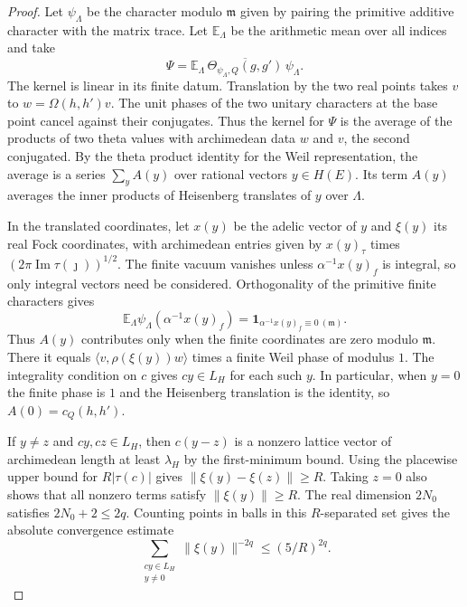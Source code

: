 \begin{proof}
Let $\psi_\Lambda$ be the character modulo $\mathfrak m$ given by pairing the primitive additive character with the matrix trace. Let $\mathbb E_\Lambda$ be the arithmetic mean over all indices and take
\[
 \Psi=\mathbb E_\Lambda\,
          \overline{\Theta_{\psi_\Lambda,Q}(g,g')}\,\psi_\Lambda .
\]
The kernel is linear in its finite datum. Translation by the two real points takes $v$ to $w=\Omega(h,h')v$. The unit phases of the two unitary characters at the base point cancel against their conjugates. Thus the kernel for $\Psi$ is the average of the products of two theta values with archimedean data $w$ and $v$, the second conjugated. By the theta product identity for the Weil representation, the average is a series $\sum_y A(y)$ over rational vectors $y\in H(E)$. Its term $A(y)$ averages the inner products of Heisenberg translates of $y$ over $\Lambda$.

In the translated coordinates, let $x(y)$ be the adelic vector of $y$ and $\xi(y)$ its real Fock coordinates, with archimedean entries given by $x(y)_\tau$ times $(2\pi\operatorname{Im}\tau(\jmath{}))^{1/2}$. The finite vacuum vanishes unless $\alpha^{-1}x(y)_f$ is integral, so only integral vectors need be considered. Orthogonality of the primitive finite characters gives
\[
 \mathbb E_\Lambda\psi_\Lambda(\alpha^{-1}x(y)_f)=
 \mathbf 1_{\alpha^{-1}x(y)_f\equiv0\ (\mathfrak m)} .
\]
Thus $A(y)$ contributes only when the finite coordinates are zero modulo $\mathfrak m$. There it equals $\langle v,\rho(\xi(y))w\rangle$ times a finite Weil phase of modulus $1$. The integrality condition on $c$ gives $cy\in L_H$ for each such $y$. In particular, when $y=0$ the finite phase is $1$ and the Heisenberg translation is the identity, so $A(0)=c_Q(h,h')$.

If $y\ne z$ and $cy,cz\in L_H$, then $c(y-z)$ is a nonzero lattice vector of archimedean length at least $\lambda_H$ by the first-minimum bound. Using the placewise upper bound for $R|\tau(c)|$ gives $\|\xi(y)-\xi(z)\|\ge R$. Taking $z=0$ also shows that all nonzero terms satisfy $\|\xi(y)\|\ge R$. The real dimension $2N_0$ satisfies $2N_0+2\le 2q$. Counting points in balls in this $R$-separated set gives the absolute convergence estimate
\[
 \sum_{\substack{cy\in L_H\\y\ne0}}
       \|\xi(y)\|^{-2q}\le (5/R)^{2q}.
\]


\end{proof}
